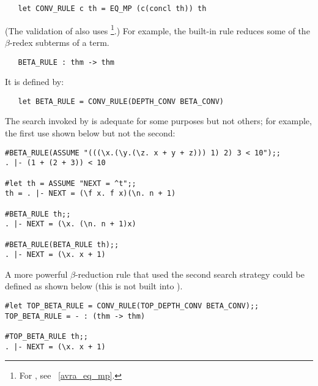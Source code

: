 \begin{hol}\begin{verbatim}
   let CONV_RULE c th = EQ_MP (c(concl th)) th
\end{verbatim}\end{hol}

\noindent (The validation of  also
uses \footnote{For , see ~\ref{avra_eq_mp}.}.)
For example, the built-in rule  reduces some
of the $\beta$-redex subterms of a term.

\begin{holboxed}
\begin{verbatim}
   BETA_RULE : thm -> thm
\end{verbatim}\end{holboxed}

\noindent It is defined by:

\begin{hol}\begin{verbatim}
   let BETA_RULE = CONV_RULE(DEPTH_CONV BETA_CONV)
\end{verbatim}\end{hol}

\noindent The search invoked by 
is adequate for some purposes but not others; for example,
the first use shown below but not the second:

\begin{session}\begin{verbatim}
#BETA_RULE(ASSUME "(((\x.(\y.(\z. x + y + z))) 1) 2) 3 < 10");;
. |- (1 + (2 + 3)) < 10

#let th = ASSUME "NEXT = ^t";;
th = . |- NEXT = (\f x. f x)(\n. n + 1)

#BETA_RULE th;;
. |- NEXT = (\x. (\n. n + 1)x)

#BETA_RULE(BETA_RULE th);;
. |- NEXT = (\x. x + 1)
\end{verbatim}\end{session}

\noindent A more powerful
$\beta$-reduction rule
that used the second  search strategy could be defined as shown below
(this is not built into \HOL).

\begin{session}\begin{verbatim}
#let TOP_BETA_RULE = CONV_RULE(TOP_DEPTH_CONV BETA_CONV);;
TOP_BETA_RULE = - : (thm -> thm)

#TOP_BETA_RULE th;;
. |- NEXT = (\x. x + 1)
\end{verbatim}\end{session}

